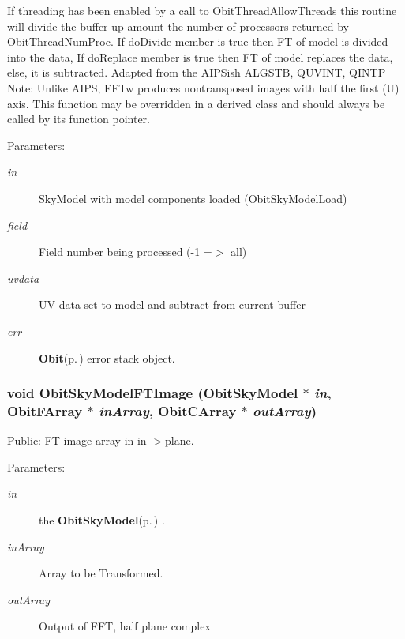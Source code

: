 If threading has been enabled by a call to Obit\-Thread\-Allow\-Threads this routine will divide the buffer up amount the number of processors returned by Obit\-Thread\-Num\-Proc. If do\-Divide member is true then FT of model is divided into the data, If do\-Replace member is true then FT of model replaces the data, else, it is subtracted. Adapted from the AIPSish ALGSTB, QUVINT, QINTP Note: Unlike AIPS, FFTw produces nontransposed images with half the first (U) axis. This function may be overridden in a derived class and should always be called by its function pointer. \begin{Desc}
\item[Parameters:]
\begin{description}
\item[{\em in}]Sky\-Model with model components loaded (Obit\-Sky\-Model\-Load) \item[{\em field}]Field number being processed (-1 =$>$ all) \item[{\em uvdata}]UV data set to model and subtract from current buffer \item[{\em err}]{\bf Obit}{\rm (p.\,\pageref{structObit})} error stack object. \end{description}
\end{Desc}
\subsubsection{\setlength{\rightskip}{0pt plus 5cm}void Obit\-Sky\-Model\-FTImage ({\bf Obit\-Sky\-Model} $\ast$ {\em in}, {\bf Obit\-FArray} $\ast$ {\em in\-Array}, {\bf Obit\-CArray} $\ast$ {\em out\-Array})}\label{ObitSkyModel_8c_a40}


Public: FT image array in in-$>$plane. 

\begin{Desc}
\item[Parameters:]
\begin{description}
\item[{\em in}]the {\bf Obit\-Sky\-Model}{\rm (p.\,\pageref{structObitSkyModel})} . \item[{\em in\-Array}]Array to be Transformed. \item[{\em out\-Array}]Output of FFT, half plane complex \end{description}
\end{Desc}
